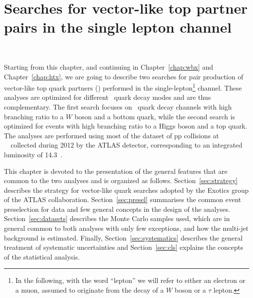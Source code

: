 \clearpage{\pagestyle{empty}\cleardoublepage}

\chapter{Searches for vector-like top partner pairs in the single lepton channel}~\label{chap:vlq}

Starting from this chapter, and continuing in Chapter~\ref{chap:wbx} 
and Chapter~\ref{chap:htx}, we are going to describe two 
searches for pair production of vector-like top quark 
partners (\TTbar) performed in the 
single-lepton\footnote{In the following, with the 
word ``lepton'' we will 
refer to either an electron or a muon, assumed to 
originate from the decay of a $W$ boson or a $\tau$ lepton.}
 channel. These analyses
are optimized for different \T\ quark decay modes and are thus complementary.
The first search focuses on  \T\ quark decay channels with high 
branching ratio to 
a $W$ boson and a bottom quark, while the second search is optimized for events with 
high branching ratio to a Higgs boson and a top quark. 
The analyses are performed using most
of the dataset of pp collisions at
~\tev\ collected during 2012
by the ATLAS detector, corresponding to an integrated luminosity of  14.3~\ifb.

This chapter is devoted to the presentation of the general features that are common to 
the two analyses and is organized as follows.
Section~\ref{sec:strategy}
describes the strategy for vector-like quark searches adopted 
by the Exotics group of the ATLAS collaboration.
Section~\ref{sec:presel}
summarises the common event preselection for data and few general concepts in the
design of the analyses. Section~\ref{sec:datasets}
describes the Monte Carlo samples used, which
are in general common to both analyses with only few exceptions,
and how the multi-jet background is estimated. 
Finally, Section~\ref{sec:systematics} 
describes the general treatment of systematic uncertainties
and Section~\ref{sec:cls} explains the concepts of the statistical analysis.

